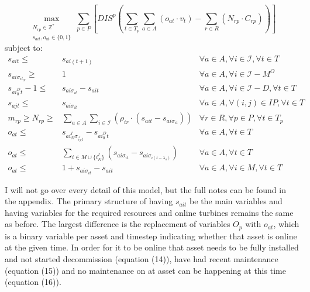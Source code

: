 \documentclass[a4paper,12pt]{article}
\begin{document}
\begin{equation}
	\max_{\substack{N_{rp} \in \mathbb{Z}^* \\ 
	s_{ait}, o_{at} \in \{0, 1\}}} 
	\sum_{p \in P} [ DIS^p (\sum_{t\in T_p} \sum_{a \in A} (o_{at} \cdot v_t)  - \sum_{r\in R} (N_{rp} \cdot C_{rp})) ]
\end{equation}
subject to:
\begin{align}
s_{ait} \leq& s_{ai(t+1)}															& \forall a \in A, \forall i \in \mathcal{I}, \forall t \in T		\\
s_{ai\sigma_{it_N}} \geq& 1														& \forall a \in A, \forall i \in \mathcal{I} - M^O			\\
s_{ai^D_0t} - 1 \leq& s_{ai\sigma_{it}} - s_{ait}											& \forall a \in A, \forall i \in \mathcal{I} - D, \forall t \in T	\\
s_{ajt} \leq& s_{ai\sigma_{it}}														& \forall a \in A, \forall (i, j) \in IP, \forall t \in T 		\\
m_{rp} \geq N_{rp} \geq& \sum_{a\in A} \sum_{i\in \mathcal{I}} (\rho_{ir} \cdot (s_{ait} - s_{ai\sigma_{it}})) 		& \forall r \in R, \forall p \in P, \forall t \in T_p 			\\
o_{at} \leq& s_{ai^I_N\sigma_{i^I_Nt}} - s_{ai^D_0t}										& \forall a \in A, \forall t \in T					\\
o_{at} \leq& \sum_{i \in M \cup \{i^I_N\}} (s_{ai\sigma_{it}} - s_{ai\sigma_{i(t-\lambda_a)}})				& \forall a \in A, \forall t \in T					\\
o_{at} \leq& 1 + s_{ai\sigma_{it}} - s_{ait}												& \forall a \in A, \forall i \in M, \forall t \in T		
\end{align}

I will not go over every detail of this model, but the full notes can be found in the appendix. %
The primary structure of having $s_{ait}$ be the main variables and having variables for the required resources and online turbines remains the same as before. The largest difference is the replacement of variables $O_p$ with $o_{at}$, which is a binary variable per asset and timestep indicating whether that asset is online at the given time. In order for it to be online that asset needs to be fully installed and not started decommission (equation (14)), have had recent maintenance (equation (15)) and no maintenance on at asset can be happening at this time (equation (16)). 
\end{document}
